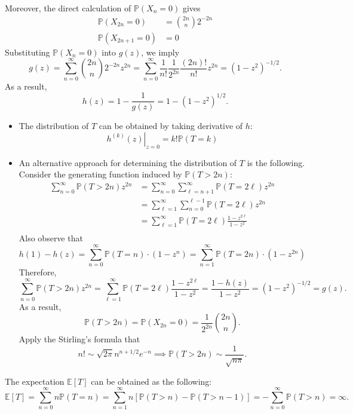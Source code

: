 Moreover, the direct calculation of $\mathbb{P}(X_n=0)$ gives
\begin{align*}
\mathbb{P}(X_{2n}=0)&=\binom{2n}{n}2^{-2n}\\
\mathbb{P}(X_{2n+1}=0)&=0
\end{align*}
Substituting $\mathbb{P}(X_n=0)$ into $g(z)$, we imply
\[
g(z) = \sum_{n=0}^\infty\binom{2n}{n}2^{-2n}z^{2n}
=
\sum_{n=0}^\infty\frac{1}{n!}\frac{1}{2^{2n}}\frac{(2n)!}{n!}z^{2n} = (1-z^2)^{-1/2}.
\]
As a result, 
\[
h(z) = 1 - \frac{1}{g(z)} = 1-(1-z^2)^{1/2}.
\]
\begin{itemize}
\item
The distribution of $T$ can be obtained by taking derivative of $h$:
\[
\left.h^{(k)}(z)\right|_{z=0} = k!\mathbb{P}(T=k)
\]
\item
An alternative approach for determining the distribution of $T$ is the following.
Consider the generating function induced by $\mathbb{P}(T>2n)$:
\begin{align*}
\sum_{n=0}^\infty\mathbb{P}(T>2n)z^{2n}
&=
\sum_{n=0}^\infty\sum_{\ell=n+1}^\infty\mathbb{P}(T=2\ell)z^{2n}\\
&=
\sum_{\ell=1}^\infty\sum_{n=0}^{\ell-1}\mathbb{P}(T=2\ell)z^{2n}\\
&=\sum_{\ell=1}^\infty\mathbb{P}(T=2\ell)\frac{1-z^{2\ell}}{1-z^2}\\
\end{align*}
Also observe that 
\[
h(1)-h(z)=\sum_{n=0}^\infty\mathbb{P}(T=n)\cdot(1-z^n)
=
\sum_{n=1}^\infty\mathbb{P}(T=2n)\cdot(1-z^{2n})
\]
Therefore,
\[
\sum_{n=0}^\infty\mathbb{P}(T>2n)z^{2n}
=
\sum_{\ell=1}^\infty\mathbb{P}(T=2\ell)\frac{1-z^{2\ell}}{1-z^2}
=
\frac{1-h(z)}{1-z^2}=(1-z^2)^{-1/2}=g(z).
\]
As a result,
\[
\mathbb{P}(T>2n)
=
\mathbb{P}(X_{2n}=0)
=\frac{1}{2^{2n}}\binom{2n}{n}.
\]
Apply the Stirling's formula that 
\[
n!\sim \sqrt{2\pi}n^{n+1/2}e^{-n}
\implies
\mathbb{P}(T>2n)\sim \frac{1}{\sqrt{n\pi}}.
\]
\end{itemize}
The expectation $\mathbb{E}[T]$ can be obtained as the following:
\[
\mathbb{E}[T]
=\sum_{n=0}^\infty n\mathbb{P}(T=n)
=\sum_{n=1}^\infty n[\mathbb{P}(T>n) - \mathbb{P}(T>n-1)]
=
-\sum_{n=0}^\infty \mathbb{P}(T>n)=\infty.
\]
%
%
%
%
